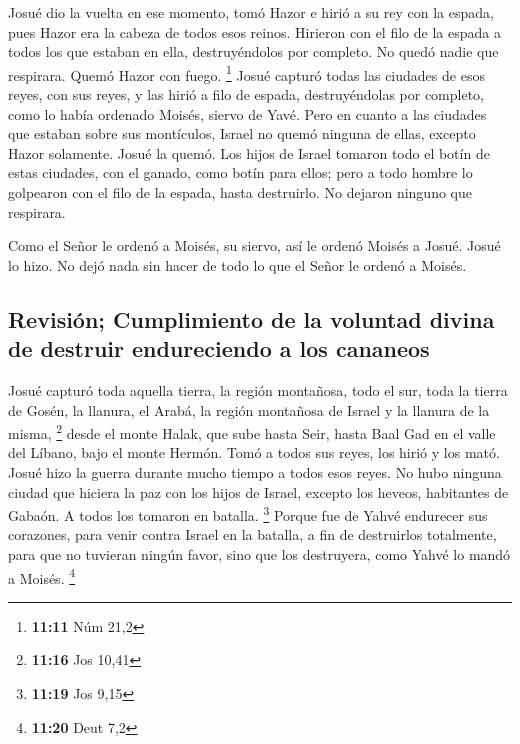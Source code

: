 \begin{paracol}{2}
 Josué dio la vuelta en ese momento, tomó Hazor e hirió a
su rey con la espada, pues Hazor era la cabeza de todos esos reinos.
 Hirieron con el filo de la espada a todos los que
estaban en ella, destruyéndolos por completo. No quedó nadie que
respirara. Quemó Hazor con fuego. \footnote{\textbf{11:11} Núm 21,2}
 Josué capturó todas las ciudades de esos reyes, con sus
reyes, y las hirió a filo de espada, destruyéndolas por completo, como
lo había ordenado Moisés, siervo de Yavé.  Pero en cuanto
a las ciudades que estaban sobre sus montículos, Israel no quemó ninguna
de ellas, excepto Hazor solamente. Josué la quemó.  Los
hijos de Israel tomaron todo el botín de estas ciudades, con el ganado,
como botín para ellos; pero a todo hombre lo golpearon con el filo de la
espada, hasta destruirlo. No dejaron ninguno que respirara.

 Como el Señor le ordenó a Moisés, su siervo, así le
ordenó Moisés a Josué. Josué lo hizo. No dejó nada sin hacer de todo lo
que el Señor le ordenó a Moisés.

\hypertarget{revisiuxf3n-cumplimiento-de-la-voluntad-divina-de-destruir-endureciendo-a-los-cananeos}{%
\subsection{Revisión; Cumplimiento de la voluntad divina de destruir
endureciendo a los
cananeos}\label{revisiuxf3n-cumplimiento-de-la-voluntad-divina-de-destruir-endureciendo-a-los-cananeos}}

 Josué capturó toda aquella tierra, la región montañosa,
todo el sur, toda la tierra de Gosén, la llanura, el Arabá, la región
montañosa de Israel y la llanura de la misma, \footnote{\textbf{11:16}
  Jos 10,41}  desde el monte Halak, que sube hasta Seir,
hasta Baal Gad en el valle del Líbano, bajo el monte Hermón. Tomó a
todos sus reyes, los hirió y los mató.  Josué hizo la
guerra durante mucho tiempo a todos esos reyes.  No hubo
ninguna ciudad que hiciera la paz con los hijos de Israel, excepto los
heveos, habitantes de Gabaón. A todos los tomaron en batalla.
\footnote{\textbf{11:19} Jos 9,15}  Porque fue de Yahvé
endurecer sus corazones, para venir contra Israel en la batalla, a fin
de destruirlos totalmente, para que no tuvieran ningún favor, sino que
los destruyera, como Yahvé lo mandó a Moisés. \footnote{\textbf{11:20}
  Deut 7,2}


\end{paracol}
